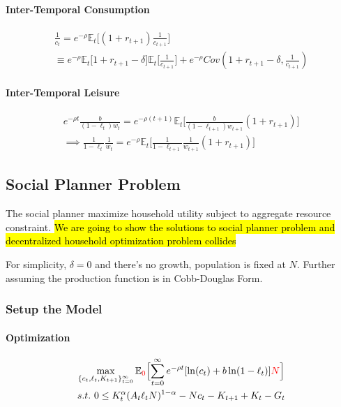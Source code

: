 \documentclass[11pt]{article}
\newcommand{\expat}[2]{\mathbb{E}_{#1}\Big[{#2}\Big]}
\begin{document}
			\paragraph{Inter-Temporal Consumption}
			\begin{gather}
				\frac{1}{c_t} = e^{-\rho} \expat{t}{(1 + r_{t+1})\frac{1}{c_{t+1}}} \\
				\equiv e^{-\rho} \expat{t}{1+r_{t+1}-\delta}\expat{t}{\frac{1}{c_{t+1}}} + e^{-\rho} Cov(1+r_{t+1}-\delta, \frac{1}{c_{t+1}})
			\end{gather}
			
			\paragraph{Inter-Temporal Leisure}
			\begin{gather}
				e^{-\rho t} \frac{b}{(1-\ell_t) w_t} = e^{-\rho (t+1)} \expat{t}{\frac{b}{(1-\ell_{t+1})w_{t+1}} (1 + r_{t+1})} \\
				\implies \frac{1}{1-\ell_t} \frac{1}{w_t} = e^{-\rho} \expat{t}{\frac{1}{1-\ell_{t+1}}\frac{1}{w_{t+1}} (1 + r_{t+1})}
			\end{gather}
		\subsection{Social Planner Problem}
			\par The social planner maximize household utility subject to aggregate resource constraint. \hl{We are going to show the solutions to social planner problem and decentralized household optimization problem collides }
			\begin{assumption}
				For simplicity, $\delta=0$ and there's no growth, population is fixed at $N$. Further assuming the production function is in Cobb-Douglas Form.
			\end{assumption}
		\subsubsection{Setup the Model}
			\paragraph{Optimization}
			\begin{gather}
				\max_{\{c_t, \ell_t, K_{t+1}\}_{t=0}^\infty} \expat{\textcolor{red}{0}}{\sum_{t=0}^\infty e^{-\rho t} [\ln(c_t) + b \ln(1-\ell_t)]\textcolor{red}{N}} \\
				s.t.\ 0 \leq K_t^\alpha (A_t \ell_t N)^{1-\alpha} - Nc_t - K_{t+1} + K_t - G_t
			\end{gather}
\end{document}
